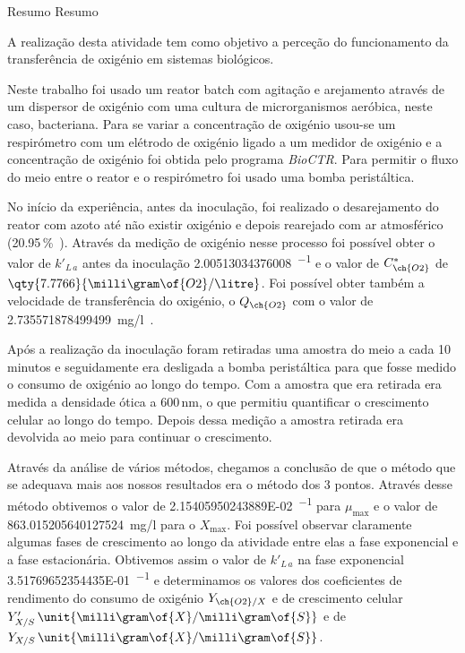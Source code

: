\documentclass[\mainfilename]{subfiles}
\begin{document}

{Resumo} %
{Resumo} %

A realização desta atividade tem como objetivo a perceção do funcionamento da transferência de oxigénio em sistemas biológicos.\par
Neste trabalho foi usado um reator batch com agitação e arejamento através de um dispersor de oxigénio com uma cultura de microrganismos aeróbica, neste caso, bacteriana. Para se variar a concentração de oxigénio usou-se um respirómetro com um elétrodo de oxigénio ligado a um medidor de oxigénio e a concentração de oxigénio foi obtida pelo programa \textit{BioCTR}. Para permitir o fluxo do meio entre o reator e o respirómetro foi usado uma bomba peristáltica.\par
No início da experiência, antes da inoculação, foi realizado o desarejamento do reator com azoto até não existir oxigénio e depois rearejado com ar atmosférico (20.95\,\unit{\percent{}}). Através da medição de oxigénio nesse processo foi possível obter o valor de \(k'_{L\,a}\) antes da inoculação \qty{2.00513034376008}{\min^{-1}} e o valor de \(C^*_{\ch{O2}}\) de \(\qty{7.7766}{\milli\gram\of{O2}/\litre}\). Foi possível obter também a velocidade de transferência do oxigénio, o \(Q_{\ch{O2}}\) com o valor de \qty{2.735571878499499}{\milli\gram/\litre.\min}.\par
Após a realização da inoculação foram retiradas uma amostra do meio a cada 10 minutos e seguidamente era desligada a bomba peristáltica para que fosse medido o consumo de oxigénio ao longo do tempo. Com a amostra que era retirada era medida a densidade ótica a 600\,\unit{\nano\metre}, o que permitiu quantificar o crescimento celular ao longo do tempo. Depois dessa medição a amostra retirada era devolvida ao meio para continuar o crescimento.\par
Através da análise de vários métodos, chegamos a conclusão de que o método que se adequava mais aos nossos resultados era o método dos 3 pontos. Através desse método obtivemos o valor de \qty{2.15405950243889E-02}{\min^{-1}} para \(\mu_{\max}\) e o valor de \qty{863.015205640127524}{\milli\gram/\litre} para o \(X_{\max}\). 
Foi possível observar claramente algumas fases de crescimento ao longo da atividade entre elas a fase exponencial e a fase estacionária. Obtivemos assim o valor de \(k'_{L\,a}\) na fase exponencial \qty{3.51769652354435E-01}{\min^{-1}} e determinamos os valores dos coeficientes de rendimento do consumo de oxigénio \(Y_{\ch{O2}/X}\) e de crescimento celular \(Y'_{X/S}\,\unit{\milli\gram\of{X}/\milli\gram\of{S}}\) e de \(Y_{X/S}\,\unit{\milli\gram\of{X}/\milli\gram\of{S}}\).
\end{document}

